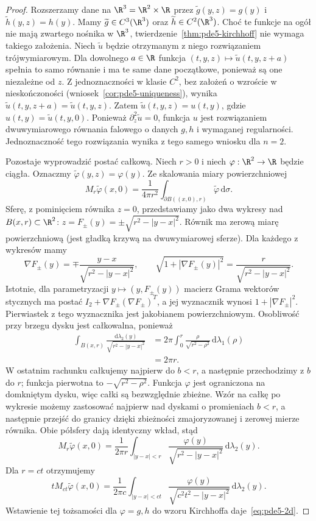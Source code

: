 \begin{proof}
Rozszerzamy dane na $\R^3=\R^2\times\R$ przez
$\widetilde g(y,z)=g(y)$ i $\widetilde h(y,z)=h(y)$.
Mamy $\widetilde g\in C^3(\R^3)$ oraz
$\widetilde h\in C^2(\R^3)$. Choć te funkcje
na ogół nie mają zwartego nośnika w $\R^3$,
twierdzenie~\ref{thm:pde5-kirchhoff} nie wymaga
takiego założenia. Niech $\widetilde u$ będzie
otrzymanym z niego rozwiązaniem trójwymiarowym.
Dla dowolnego $a\in\R$ funkcja
$(t,y,z)\mapsto\widetilde u(t,y,z+a)$
spełnia to samo równanie i ma te same dane
początkowe, ponieważ są one niezależne od $z$.
Z jednoznaczności w klasie $C^2$, bez założeń
o wzroście w nieskończoności
(wniosek~\ref{cor:pde5-uniqueness}), wynika
$\widetilde u(t,y,z+a)=\widetilde u(t,y,z)$.
Zatem $\widetilde u(t,y,z)=u(t,y)$, gdzie
$u(t,y)=\widetilde u(t,y,0)$.
Ponieważ $\partial_z^2\widetilde u=0$,
funkcja $u$ jest rozwiązaniem dwuwymiarowego
równania falowego o danych $g,h$ i wymaganej
regularności. Jednoznaczność tego rozwiązania
wynika z tego samego wniosku dla $n=2$.

Pozostaje wyprowadzić postać całkową. Niech $r>0$
i niech $\varphi:\R^2\to\R$ będzie ciągła.
Oznaczmy $\widetilde\varphi(y,z)=\varphi(y)$.
Ze skalowania miary powierzchniowej
\[
 M_r\widetilde\varphi(x,0)=
 \frac1{4\pi r^2}
 \int_{\partial B((x,0),r)}\widetilde\varphi\,
 \mathrm d\sigma.
\]
Sferę, z pominięciem równika $z=0$, przedstawiamy
jako dwa wykresy nad $B(x,r)\subset\R^2$:
$z=F_\pm(y)=\pm\sqrt{r^2-|y-x|^2}$.
Równik ma zerową miarę powierzchniową
(jest gładką krzywą na dwuwymiarowej sferze).
Dla każdego z wykresów mamy
\[
 \nabla F_\pm(y)=\mp\frac{y-x}{\sqrt{r^2-|y-x|^2}},
 \qquad
 \sqrt{1+|\nabla F_\pm(y)|^2}
 =\frac r{\sqrt{r^2-|y-x|^2}}.
\]
Istotnie, dla parametryzacji
$y\mapsto(y,F_\pm(y))$ macierz Grama wektorów
stycznych ma postać $I_2+\nabla F_\pm(\nabla F_\pm)^T$,
a jej wyznacznik wynosi $1+|\nabla F_\pm|^2$.
Pierwiastek z tego wyznacznika jest jakobianem
powierzchniowym. Osobliwość przy brzegu dysku
jest całkowalna, ponieważ
\[
 \begin{aligned}
 \int_{B(x,r)}\frac{\mathrm d\lambda_2(y)}
 {\sqrt{r^2-|y-x|^2}}
 &=2\pi\int_0^r
      \frac{\rho}{\sqrt{r^2-\rho^2}}\,
      \mathrm d\lambda_1(\rho)\\
 &=2\pi r.
 \end{aligned}
\]
W ostatnim rachunku całkujemy najpierw do $b<r$,
a następnie przechodzimy z $b$ do $r$;
funkcja pierwotna to $-\sqrt{r^2-\rho^2}$.
Funkcja $\varphi$ jest ograniczona na domkniętym
dysku, więc całki są bezwzględnie zbieżne.
Wzór na całkę po wykresie możemy zastosować
najpierw nad dyskami o promieniach $b<r$,
a następnie przejść do granicy dzięki
zbieżności zmajoryzowanej i zerowej mierze równika.
Obie półsfery dają identyczny wkład, stąd
\[
 M_r\widetilde\varphi(x,0)=\frac1{2\pi r}
 \int_{|y-x|<r}\frac{\varphi(y)}
 {\sqrt{r^2-|y-x|^2}}\,\mathrm d\lambda_2(y).
\]
Dla $r=ct$ otrzymujemy
\[
 tM_{ct}\widetilde\varphi(x,0)=\frac1{2\pi c}
 \int_{|y-x|<ct}\frac{\varphi(y)}
 {\sqrt{c^2t^2-|y-x|^2}}\,\mathrm d\lambda_2(y).
\]
Wstawienie tej tożsamości dla $\varphi=g,h$
do wzoru Kirchhoffa daje~\eqref{eq:pde5-2d}.


\end{proof}
